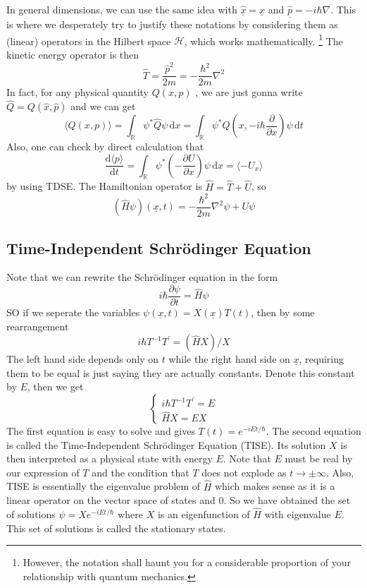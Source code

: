 In general dimensions, we can use the same idea with $\hat{\underline{x}}=\underline{x}$ and $\hat{\underline{p}}=-i\hbar\nabla$.
This is where we desperately try to justify these notations by considering them as (linear) operators in the Hilbert space $\mathcal H$, which works mathematically.
\footnote{However, the notation shall haunt you for a considerable proportion of your relationship with quantum mechanics.}
The kinetic energy operator is then
$$\hat{T}=\frac{\hat{p}^2}{2m}=-\frac{\hbar^2}{2m}\nabla^2$$
In fact, for any physical quantity $Q(x,p)$ , we are just gonna write $\hat{Q}=Q(\hat{x},\hat{p})$ and we can get
$$\langle Q(x,p)\rangle=\int_{\mathbb R}\psi^*\hat{Q}\psi\,\mathrm dx=\int_{\mathbb R}\psi^*Q\left( x,-i\hbar\frac{\partial}{\partial x} \right)\psi\,\mathrm dt$$
Also, one can check by direct calculation that
$$\frac{\mathrm d\langle p\rangle}{\mathrm dt}=\int_{\mathbb R}\psi^*\left( -\frac{\partial U}{\partial x} \right)\psi\,\mathrm dx=\langle -U_x\rangle$$
by using TDSE.
The Hamiltonian operator is $\hat{H}=\hat{T}+\hat{U}$, so
$$(\hat{H}\psi)(\underline{x},t)=-\frac{\hbar^2}{2m}\nabla^2\psi+U\psi$$
\subsection{Time-Independent Schr\"odinger Equation}
Note that we can rewrite the Schr\"odinger equation in the form
$$i\hbar\frac{\partial\psi}{\partial t}=\hat{H}\psi$$
SO if we seperate the variables $\psi(\underline{x},t)=X(\underline{x})T(t)$, then by some rearrangement
$$i\hbar T^{-1}T^\prime=(\hat{H}X)/X$$
The left hand side depends only on $t$ while the right hand side on $\underline{x}$, requiring them to be equal is just saying they are actually constants.
Denote this constant by $E$, then we get
$$\begin{cases}
    i\hbar T^{-1}T^\prime=E\\
    \hat{H}X=EX
\end{cases}$$
The first equation is easy to solve and gives $T(t)=e^{-iEt/\hbar}$.
The second equation is called the Time-Independent Schr\"odinger Equation (TISE).
Its solution $X$ is then interpreted as a physical state with energy $E$.
Note that $E$ must be real by our expression of $T$ and the condition that $T$ does not explode as $t\to\pm\infty$.
Also, TISE is essentially the eigenvalue problem of $\hat{H}$ which makes sense as it is a linear operator on the vector space of states and $0$.
So we have obtained the set of solutions $\psi=Xe^{-iEt/\hbar}$ where $X$ is an eigenfunction of $\hat{H}$ with eigenvalue $E$.
This set of solutions is called the stationary states.
